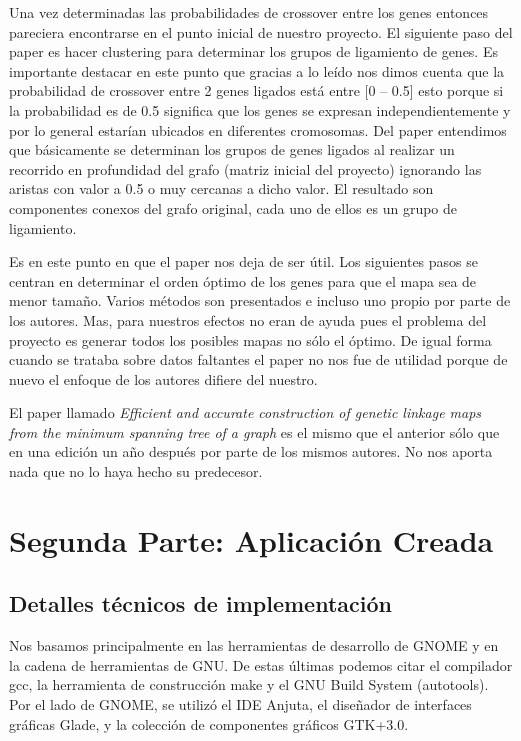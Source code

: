 \documentclass{article}
\begin{document}
	Una vez determinadas las probabilidades de crossover entre los genes entonces pareciera encontrarse en el punto inicial de nuestro proyecto. El siguiente paso del paper es hacer clustering para determinar los grupos de ligamiento de genes. Es importante destacar en este punto que gracias a lo leído nos dimos cuenta que la probabilidad de crossover entre 2 genes ligados está entre [0 – 0.5] esto porque si la probabilidad es de 0.5 significa que los genes se expresan independientemente y por lo general estarían ubicados en diferentes cromosomas. Del paper entendimos que básicamente se determinan los grupos de genes ligados al realizar un recorrido en profundidad del grafo (matriz inicial del proyecto) ignorando las aristas con valor a 0.5 o muy cercanas a dicho valor. El resultado son componentes conexos del grafo original, cada uno de ellos es un grupo de ligamiento.

	Es en este punto en que el paper nos deja de ser útil. Los siguientes pasos se centran en determinar el orden óptimo de los genes para que el mapa sea de menor tamaño. Varios métodos son presentados e incluso uno propio por parte de los autores. Mas, para nuestros efectos no eran de ayuda pues el problema del proyecto es generar todos los posibles mapas no sólo el óptimo. De igual forma cuando se  trataba sobre datos faltantes el paper no nos fue de utilidad porque de nuevo el enfoque de los autores difiere del nuestro.

	El paper llamado \textit{Efficient and accurate construction of genetic linkage maps from the minimum spanning tree of a graph} \cite{wu2008efficient} es el mismo que el anterior sólo que en una edición un año después por parte de los mismos autores. No nos aporta nada que no lo haya hecho su predecesor.

	
	
	\section{Segunda Parte: Aplicación Creada}
	
	\subsection{Detalles técnicos de implementación}
	
	Nos basamos principalmente en las herramientas de desarrollo de GNOME y en la cadena de herramientas de GNU. De estas últimas podemos citar el compilador gcc, la herramienta de construcción make y el GNU Build System (autotools). Por el lado de GNOME, se utilizó el IDE Anjuta, el diseñador de interfaces gráficas Glade, y la colección de componentes gráficos GTK+3.0.
	
\end{document}
